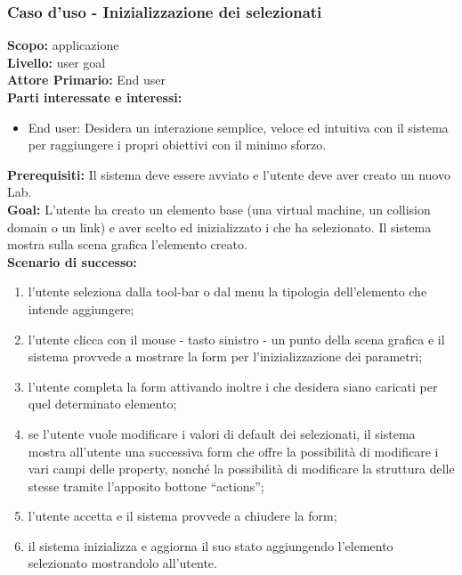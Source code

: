 \begin{flushleft}
\begin{boxedminipage}{\textwidth}

\subsubsection*{Caso d'uso - Inizializzazione dei \plugin{} selezionati}

\textbf{Scopo:} applicazione \visualnetkit{} \\
\textbf{Livello:} user goal \\
\textbf{Attore Primario:} End user \\
\textbf{Parti interessate e interessi:}
\begin{itemize}
\item End user: Desidera un interazione semplice, veloce ed intuitiva con il sistema per raggiungere i propri obiettivi con il minimo sforzo.
\end{itemize}

\textbf{Prerequisiti:} Il sistema deve essere avviato e l'utente deve aver creato un nuovo Lab. \\
\textbf{Goal:} L'utente ha creato un elemento base (una virtual machine, un collision domain o un link) e aver scelto ed inizializzato i \plugin{} che ha selezionato. Il sistema mostra sulla scena grafica l'elemento creato. \\

\textbf{Scenario di successo:}
\begin{enumerate}
\item l'utente seleziona dalla tool-bar o dal menu la tipologia dell'elemento che intende aggiungere;
\item l'utente clicca con il mouse - tasto sinistro - un punto della scena grafica e il sistema provvede a mostrare la form per l'inizializzazione dei parametri;
\item l'utente completa la form attivando inoltre i \plugin{} che desidera siano caricati per quel determinato elemento;
\item se l'utente vuole modificare i valori di default dei \plugin{} selezionati, il sistema mostra all'utente una successiva form che offre la possibilità di modificare i vari campi delle property, nonché la possibilità di modificare la struttura delle stesse tramite l'apposito bottone ``actions'';
\item l'utente accetta e il sistema provvede a chiudere la form;
\item il sistema inizializza e aggiorna il suo stato aggiungendo l'elemento selezionato mostrandolo all'utente.
\end{enumerate}

\end{boxedminipage}
\end{flushleft}

